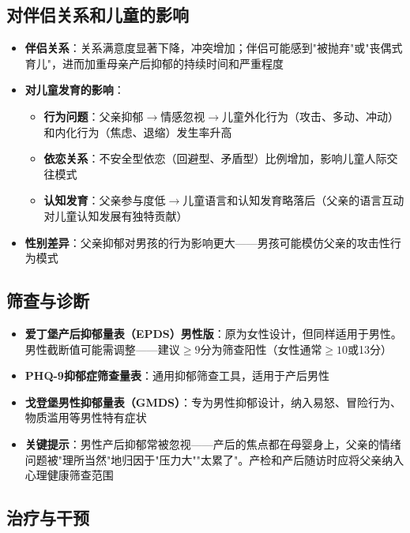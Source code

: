 \subsection{对伴侣关系和儿童的影响}

\begin{itemize}[leftmargin=2cm]
	\item \textbf{伴侣关系}：关系满意度显著下降，冲突增加；伴侣可能感到"被抛弃"或"丧偶式育儿"，进而加重母亲产后抑郁的持续时间和严重程度
	\item \textbf{对儿童发育的影响}：
	\begin{itemize}
		\item \textbf{行为问题}：父亲抑郁$\rightarrow$情感忽视$\rightarrow$儿童外化行为（攻击、多动、冲动）和内化行为（焦虑、退缩）发生率升高
		\item \textbf{依恋关系}：不安全型依恋（回避型、矛盾型）比例增加，影响儿童人际交往模式
		\item \textbf{认知发育}：父亲参与度低$\rightarrow$儿童语言和认知发育略落后（父亲的语言互动对儿童认知发展有独特贡献）
	\end{itemize}
	\item \textbf{性别差异}：父亲抑郁对男孩的行为影响更大——男孩可能模仿父亲的攻击性行为模式
\end{itemize}

\subsection{筛查与诊断}

\begin{itemize}[leftmargin=2cm]
	\item \textbf{爱丁堡产后抑郁量表（EPDS）男性版}：原为女性设计，但同样适用于男性。男性截断值可能需调整——建议$\geq 9$分为筛查阳性（女性通常$\geq 10$或13分）
	\item \textbf{PHQ-9抑郁症筛查量表}：通用抑郁筛查工具，适用于产后男性
	\item \textbf{戈登堡男性抑郁量表（GMDS）}：专为男性抑郁设计，纳入易怒、冒险行为、物质滥用等男性特有症状
	\item \textbf{关键提示}：男性产后抑郁常被忽视——产后的焦点都在母婴身上，父亲的情绪问题被"理所当然"地归因于"压力大""太累了"。产检和产后随访时应将父亲纳入心理健康筛查范围
\end{itemize}

\subsection{治疗与干预}

